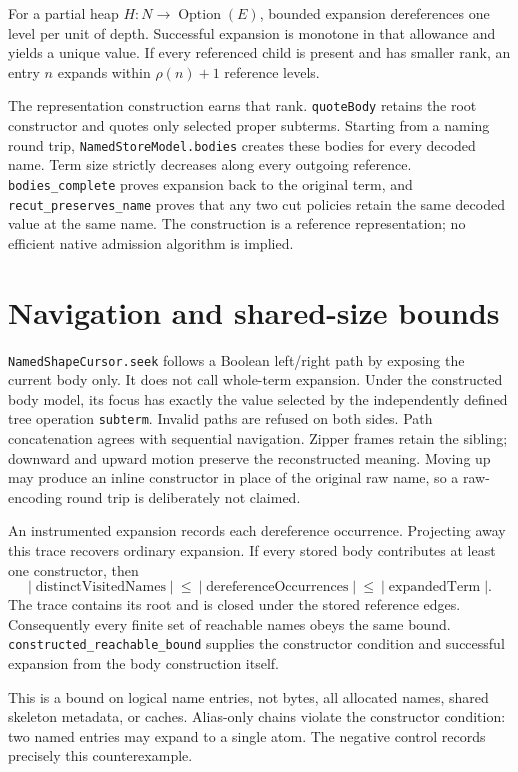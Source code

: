 \documentclass[11pt,a4paper]{article}
\newcommand{\code}[1]{\nolinkurl{#1}}
\begin{document}
For a partial heap $H:N\to\operatorname{Option}(E)$, bounded expansion
dereferences one level per unit of depth. Successful expansion is monotone
in that allowance and yields a unique value. If every referenced child is
present and has smaller rank, an entry $n$ expands within $\rho(n)+1$ reference
levels.

The representation construction earns that rank. \code{quoteBody} retains
the root constructor and quotes only selected proper subterms. Starting
from a naming round trip, \code{NamedStoreModel.bodies} creates these bodies
for every decoded name. Term size strictly decreases along every outgoing
reference. \code{bodies_complete} proves expansion back to the original
term, and \code{recut_preserves_name} proves that any two cut policies retain
the same decoded value at the same name. The construction is a reference
representation; no efficient native admission algorithm is implied.

\section{Navigation and shared-size bounds}

\code{NamedShapeCursor.seek} follows a Boolean left/right path by exposing
the current body only. It does not call whole-term expansion. Under the
constructed body model, its focus has exactly the value selected by the
independently defined tree operation \code{subterm}. Invalid paths are
refused on both sides. Path concatenation agrees with sequential navigation.
Zipper frames retain the sibling; downward and upward motion preserve the
reconstructed meaning. Moving up may produce an inline constructor in place
of the original raw name, so a raw-encoding round trip is deliberately not
claimed.

An instrumented expansion records each dereference occurrence. Projecting
away this trace recovers ordinary expansion. If every stored body contributes
at least one constructor, then
\[
 |\operatorname{distinctVisitedNames}|
 \ \le\ |\operatorname{dereferenceOccurrences}|
 \ \le\ |\operatorname{expandedTerm}|.
\]
The trace contains its root and is closed under the stored reference edges.
Consequently every finite set of reachable names obeys the same bound.
\code{constructed_reachable_bound} supplies the constructor condition and
successful expansion from the body construction itself.

This is a bound on logical name entries, not bytes, all allocated names,
shared skeleton metadata, or caches. Alias-only chains violate the
constructor condition: two named entries may expand to a single atom.
The negative control records precisely this counterexample.
\end{document}

